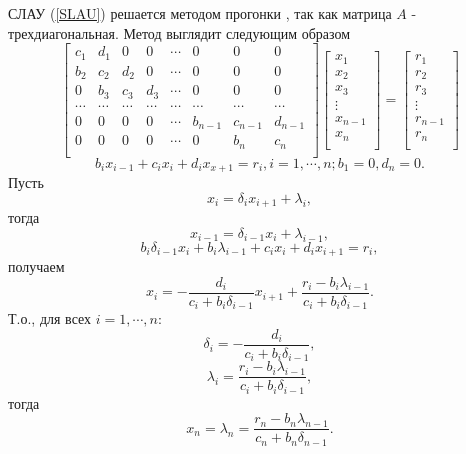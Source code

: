 СЛАУ (\ref{SLAU}) решается методом прогонки \cite{raznost_schemes}, так как матрица $A$ - трехдиагональная. Метод выглядит следующим образом
$$
\begin{bmatrix}
c_1 & d_1 & 0   & 0   & \cdots & 0 & 0 & 0 \\
b_2 & c_2 & d_2 & 0   & \cdots & 0 & 0 & 0 \\
0   & b_3 & c_3 & d_3 & \cdots & 0 & 0 & 0 \\
\cdots   & \cdots & \cdots & \cdots & \cdots & \cdots & \cdots & \cdots \\
0 & 0 & 0 & 0 & \cdots & b_{n-1} & c_{n-1} & d_{n-1} \\
0 & 0 & 0 & 0 & \cdots & 0 & b_{n} & c_{n} \\
\end{bmatrix}
\begin{bmatrix}
x_1 \\
x_2 \\
x_3 \\
\vdots \\
x_{n-1} \\
x_{n} \\
\end{bmatrix} = 
\begin{bmatrix}
r_1 \\
r_2 \\
r_3 \\
\vdots \\
r_{n-1} \\
r_{n} \\
\end{bmatrix}
$$
$$
b_ix_{i-1}+c_ix_i+d_ix_{x+1}=r_i, i=1,\cdots, n;b_1=0, d_n=0.
$$
Пусть
$$
x_i = \delta_ix_{i+1}+\lambda_i,
$$
тогда
$$
x_{i-1} = \delta_{i-1}x_i+\lambda_{i-1},
$$
$$
b_i\delta_{i-1}x_i+b_i\lambda_{i-1} + c_ix_i+d_ix_{i+1}=r_i,
$$
получаем
$$
x_i = -\frac{d_i}{c_i + b_i\delta_{i-1}}x_{i+1} + \frac{r_i - b_i\lambda_{i-1}}{c_i + b_i\delta_{i-1}}.
$$
Т.о., для всех $i=1, \cdots, n:$
$$
\delta_{i} = -\frac{d_i}{c_i + b_i\delta_{i-1}},
$$
$$
\lambda_i = \frac{r_i - b_i\lambda_{i-1}}{c_i + b_i\delta_{i-1}},
$$
тогда
$$
x_n=\lambda_n = \frac{r_n - b_n\lambda_{n-1}}{c_n + b_n\delta_{n-1}}.
$$

\newpage